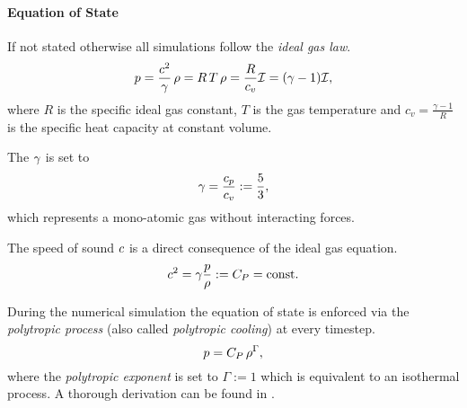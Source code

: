 \paragraph{Equation of State}
If not stated otherwise all simulations follow the \emph{ideal gas law}.
\begin{equation}
p = \frac{c^2}{\gamma} \, \rho = R\,T\,\rho = \frac{R}{c_v} \mathcal{I} = (\gamma - 1) \mathcal{I},
\end{equation}
where $R$ is the specific ideal gas constant, $T$ is the gas temperature and $c_v
= \frac{\gamma - 1}{R}$ is the specific heat capacity at constant volume. 

The  $\gamma$ is set to
\begin{equation}
\label{eqn:adiabconst}
    \gamma = \frac{c_p}{c_v} := \frac{5}{3},
\end{equation}
which represents a mono-atomic gas without interacting forces.

The speed of sound $c$ is a direct consequence of the ideal gas
equation.  \begin{equation} c^2 = \gamma \frac{p}{\rho} := C_P = \text{const.} \end{equation}

During the numerical simulation the equation of state is enforced via the
\emph{polytropic process} (also called \emph{polytropic cooling}) at
every timestep.
\begin{equation}
p = C_P \, \rho^\Gamma,
\end{equation}
where the \emph{polytropic exponent} is set to $\Gamma := 1$ which is
equivalent to an isothermal process. A thorough derivation can be found in
\cite[p. 2 ff.]{horedt2004polytropes}.


